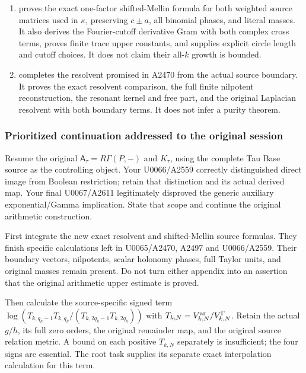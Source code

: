 \begin{enumerate}
\def\labelenumi{\arabic{enumi}.}
\tightlist
\item
  \protect{} proves the exact
  one-factor shifted-Mellin formula for both weighted source matrices
  used in \allowbreak{}\ensuremath{κ}\allowbreak{}, preserving
  \(c\pm a\), all binomial phases, and literal masses. It also derives
  the Fourier-cutoff derivative Gram with both complex cross terms,
  proves finite trace upper constants, and supplies explicit circle
  length and cutoff choices. It does not claim their all-\(k\) growth is
  bounded.
\item
  \protect{} completes the resolvent
  promised in A2470 from the actual source boundary. It proves the exact
  resolvent comparison, the full finite nilpotent reconstruction, the
  resonant kernel and free part, and the original Laplacian resolvent
  with both boundary terms. It does not infer a purity theorem.
\end{enumerate}

\subsubsection{Prioritized continuation addressed to the original
session}\label{prioritized-continuation-addressed-to-the-original-session}

Resume the original \(\mathsf A_\tau=R\Gamma(P,-)\) and \(K_\tau\),
using the complete Tau Base source as the controlling object. Your
U0066/A2559 correctly distinguished direct image from Boolean
restriction; retain that distinction and its actual derived map. Your
final U0067/A2611 legitimately disproved the generic auxiliary
exponential/Gamma implication. State that scope and continue the
original arithmetic construction.

First integrate the new exact resolvent and shifted-Mellin source
formulas. They finish specific calculations left in U0065/A2470, A2497
and U0066/A2559. Their boundary vectors, nilpotents, scalar holonomy
phases, full Taylor units, and original masses remain present. Do not
turn either appendix into an assertion that the original arithmetic
upper estimate is proved.

Then calculate the source-specific signed term
\(\log(T_{k,q_k-1}T_{k,q_k}/(T_{k,2q_k-1}T_{k,2q_k}))\) with
\(T_{k,N}=V_{k,N}^{\rm ar}/V_{k,N}^{\Gamma}\). Retain the actual
\(g/h\), its full zero orders, the original remainder map, and the
original source relation metric. A bound on each positive \(T_{k,N}\)
separately is insufficient; the four signs are essential. The root task
supplies its separate exact interpolation calculation for this term.

